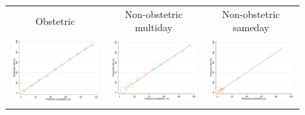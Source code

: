 \documentclass[submission]{grattan}
\begin{document}
\begin{figure}
\begin{tabularx}{\linewidth}{@{}C@{}C@{}C@{}}
Obstetric & Non-obstetric multiday & Non-obstetric sameday \\
\cmidrule(lr){1-1}\cmidrule(lr){2-2}\cmidrule(lr){3-3}
\includegraphics{atlas/Calib_obstetric.png} & \includegraphics{atlas/Calib_non_obs_MD.png} & \includegraphics{atlas/Calib_non_obs_SD.png}

\end{tabularx}
\end{figure}
\end{document}
